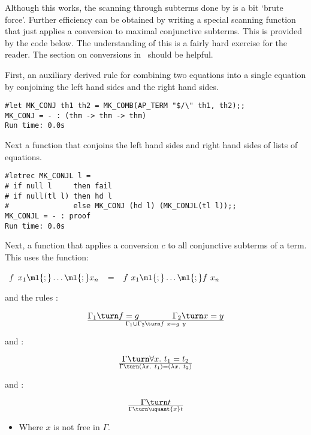 Although this works, the scanning through subterms done by
 is a bit `brute force'. Further efficiency can
be obtained by writing a special scanning function that
just applies a conversion to maximal conjunctive subterms.
This is provided by the code below.
The understanding of this is a fairly hard exercise for the reader. The
section on conversions in \DESCRIPTION\ should be helpful.

First, an auxiliary derived rule for combining two equations into
a single equation by conjoining  the left hand sides and  the
right hand sides.

\begin{session}\begin{verbatim}
#let MK_CONJ th1 th2 = MK_COMB(AP_TERM "$/\" th1, th2);;
MK_CONJ = - : (thm -> thm -> thm)
Run time: 0.0s
\end{verbatim}\end{session}

\noindent Next a function that conjoins the left hand sides and right
hand sides of lists of equations.

\begin{session}\begin{verbatim}
#letrec MK_CONJL l =
# if null l     then fail
# if null(tl l) then hd l
#               else MK_CONJ (hd l) (MK_CONJL(tl l));;
MK_CONJL = - : proof
Run time: 0.0s
\end{verbatim}\end{session}

\noindent Next, a function that applies a conversion $c$ to all
conjunctive subterms of a term. This uses the \ML{} function:

\bigskip
{}~$f$~\ml{[}$x_1\ml{;}\ldots\ml{;}x_n$\ml{]}~~=~~\ml{[}$f\ x_1\ml{;}\ldots\ml{;}f\ x_n$\ml{]}

\bigskip

\noindent and the rules :


\[ \Gamma_1 \turn f = g \qquad\qquad \Gamma_2\turn x = y \over
\Gamma_1 \cup \Gamma_2 \turn f\ x = g\ y\]

\noindent and :


\[ \Gamma \turn \forall x.\ t_1 = t_2 \over
\Gamma \turn (\lambda x.\ t_1) = (\lambda x.\ t_2)\]

\noindent and :

$$\Gamma\turn t\over\Gamma\turn\uquant{x} t$$
\begin{itemize}
\item Where $x$ is not free in $\Gamma$.
\end{itemize}


